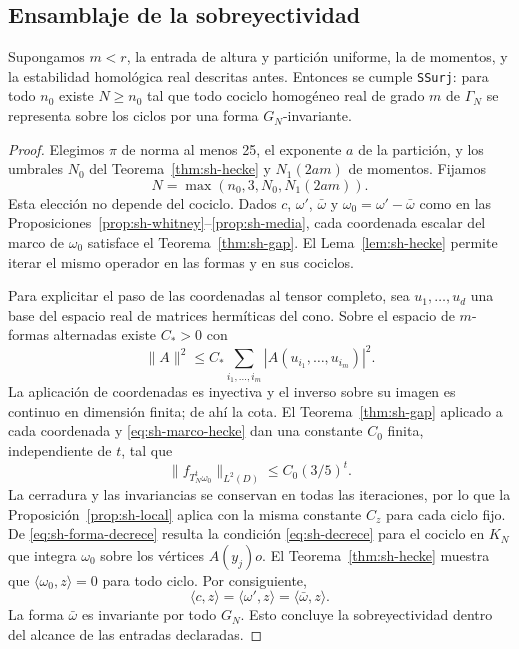 \subsection{Ensamblaje de la sobreyectividad}

\begin{teorema}
\label{thm:sh-surj}
Supongamos $m<r$, la entrada de altura y partición uniforme, la de momentos, y la estabilidad homológica real descritas antes. Entonces se cumple \texttt{SSurj}: para todo $n_0$ existe $N\ge n_0$ tal que todo cociclo homogéneo real de grado $m$ de $\Gamma_N$ se representa sobre los ciclos por una forma $G_N$-invariante.
\end{teorema}
\begin{proof}
Elegimos $\pi$ de norma al menos 25, el exponente $a$ de la partición, y los umbrales $N_0$ del Teorema~\ref{thm:sh-hecke} y $N_1(2am)$ de momentos. Fijamos
\begin{equation}
 N=\max(n_0,3,N_0,N_1(2am)).
 \label{eq:sh-umbral}
\end{equation}
Esta elección no depende del cociclo. Dados $c$, $\omega'$, $\bar\omega$ y $\omega_0=\omega'-\bar\omega$ como en las Proposiciones~\ref{prop:sh-whitney}--\ref{prop:sh-media}, cada coordenada escalar del marco de $\omega_0$ satisface el Teorema~\ref{thm:sh-gap}. El Lema~\ref{lem:sh-hecke} permite iterar el mismo operador en las formas y en sus cociclos.

Para explicitar el paso de las coordenadas al tensor completo, sea $u_1,\ldots,u_d$ una base del espacio real de matrices hermíticas del cono. Sobre el espacio de $m$-formas alternadas existe $C_*>0$ con
\[
 \|A\|^2\le C_*\sum_{i_1,\ldots,i_m}|A(u_{i_1},\ldots,u_{i_m})|^2.
\]
La aplicación de coordenadas es inyectiva y el inverso sobre su imagen es continuo en dimensión finita; de ahí la cota. El Teorema~\ref{thm:sh-gap} aplicado a cada coordenada y \eqref{eq:sh-marco-hecke} dan una constante $C_0$ finita, independiente de $t$, tal que
\begin{equation}
 \|f_{T_N^t\omega_0}\|_{L^2(D)}\le C_0(3/5)^t.
 \label{eq:sh-forma-decrece}
\end{equation}
La cerradura y las invariancias se conservan en todas las iteraciones, por lo que la Proposición~\ref{prop:sh-local} aplica con la misma constante $C_z$ para cada ciclo fijo. De \eqref{eq:sh-forma-decrece} resulta la condición \eqref{eq:sh-decrece} para el cociclo en $K_N$ que integra $\omega_0$ sobre los vértices $A(y_j)o$. El Teorema~\ref{thm:sh-hecke} muestra que $\langle\omega_0,z\rangle=0$ para todo ciclo. Por consiguiente,
\[
 \langle c,z\rangle=\langle\omega',z\rangle=\langle\bar\omega,z\rangle.
\]
La forma $\bar\omega$ es invariante por todo $G_N$. Esto concluye la sobreyectividad dentro del alcance de las entradas declaradas.
\end{proof}

